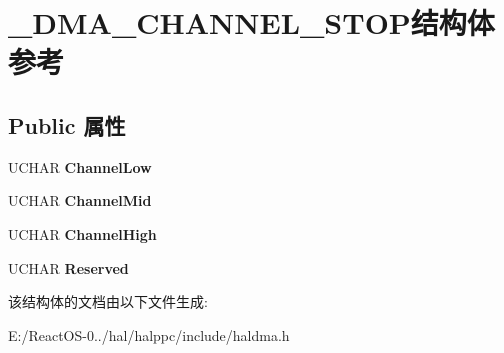 \hypertarget{struct___d_m_a___c_h_a_n_n_e_l___s_t_o_p}{}\section{\+\_\+\+D\+M\+A\+\_\+\+C\+H\+A\+N\+N\+E\+L\+\_\+\+S\+T\+O\+P结构体 参考}
\label{struct___d_m_a___c_h_a_n_n_e_l___s_t_o_p}
\subsection*{Public 属性}
\begin{DoxyCompactItemize}
\item 
\mbox{\label{struct___d_m_a___c_h_a_n_n_e_l___s_t_o_p_a75afb42e21289ab4a210745ef829b044}} 
U\+C\+H\+AR {\bfseries Channel\+Low}
\item 
\mbox{\label{struct___d_m_a___c_h_a_n_n_e_l___s_t_o_p_a0a4fb9e57ff7d87006f8252ae84cbff0}} 
U\+C\+H\+AR {\bfseries Channel\+Mid}
\item 
\mbox{\label{struct___d_m_a___c_h_a_n_n_e_l___s_t_o_p_a406f2226fec84aa12d5d1f2f03e73849}} 
U\+C\+H\+AR {\bfseries Channel\+High}
\item 
\mbox{\label{struct___d_m_a___c_h_a_n_n_e_l___s_t_o_p_aaba7d798bace0f100421c0c9e4b87449}} 
U\+C\+H\+AR {\bfseries Reserved}
\end{DoxyCompactItemize}


该结构体的文档由以下文件生成\+:\begin{DoxyCompactItemize}
\item 
E\+:/\+React\+O\+S-\/0../hal/halppc/include/haldma.\+h\end{DoxyCompactItemize}
